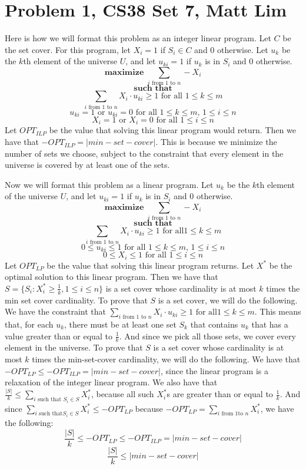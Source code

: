 \documentclass{article}
\begin{document}
\section*{Problem 1, CS38 Set 7, Matt Lim}
Here is how we will format this problem as an integer linear program. Let $C$ be
the set cover. For this
program, let $X_i = 1$ if $S_i \in C$ and $0$ otherwise. Let $u_k$ be the $k$th
element of the universe $U$, and let $u_{ki} = 1$
if $u_k$ is in $S_i$ and $0$ otherwise.
\[ \textbf{maximize } \sum_{i \text{ from $1$ to $n$}} -X_i \]
\[ \textbf{such that} \]
\[ \sum_{i \text{ from $1$ to $n$}} X_i \cdot u_{ki} \geq 1 \text{ for all $1
\leq k \leq m$} \]
\[ u_{ki} = 1 \text{ or } u_{ki} = 0 \text{ for all $1 \leq k \leq m$, $1 \leq i
\leq n$} \]
\[ X_i = 1 \text{ or } X_i = 0 \text{ for all $1 \leq i \leq n$} \]
Let $OPT_{ILP}$ be the value that solving this linear program would return. Then
we have that $-OPT_{ILP} = |min-set-cover|$. This is because we minimize the
number of sets we choose, subject to the constraint that every element in the
universe is covered by at least one of the sets.

Now we will format this problem as a linear program. Let $u_k$ be the $k$th
element of the universe $U$, and let $u_{ki} = 1$
if $u_k$ is in $S_i$ and $0$ otherwise.
\[ \textbf{maximize } \sum_{i \text{ from $1$ to $n$}} -X_i \]
\[ \textbf{such that} \]
\[ \sum_{i \text{ from $1$ to $n$}} X_i \cdot u_{ki} \geq 1 \text{ for all
$1 \leq k \leq m$} \]
\[ 0 \leq u_{ki} \leq 1 \text{ for all $1 \leq k \leq m$, $1 \leq i \leq n$} \]
\[ 0 \leq X_i \leq 1 \text{ for all $1 \leq i \leq n$} \]
Let $OPT_{LP}$ be the value that solving this linear program returns. Let $X^*$
be the optimal solution to this linear program. Then we have that
$S = \{S_i : X_i^* \geq \frac{1}{k}, 1 \leq i \leq n\}$ is a set cover whose cardinality
is at most $k$ times the min set cover cardinality. To prove that $S$ is a set
cover, we will do the following. We have the constraint that
$\sum_{i \text{ from $1$ to $n$}} X_i \cdot u_{ki} \geq 1 \text{ for all
$1 \leq k \leq m$}$. This means that, for each $u_k$, there must be at least one set
$S_k$ that contains $u_k$ that has a value greater than or equal to
$\frac{1}{k}$. And since we pick all those sets, we cover every element in the
universe. To prove that $S$ is a set cover whose cardinality is at most $k$
times the min-set-cover cardinality, we will do the following. We have that
$-OPT_{LP} \leq -OPT_{ILP} = |min-set-cover|$, since the linear program is a
relaxation of the integer linear program. We also have that $\frac{|S|}{k}
\leq \sum_{i \text{ such that $S_i \in S$}} X^*_i$, because all such $X^*_i$s
are greater than or equal to $\frac{1}{k}$. And since $\sum_{i \text{ such that
$S_i \in S$}} X^*_i \leq -OPT_{LP}$ because $-OPT_{LP} = \sum_{i \text{ from $1$
to $n$}} X^*_i$, we have the following:
\[ \frac{|S|}{k} \leq -OPT_{LP} \leq -OPT_{ILP} = |min-set-cover| \]
\[ \frac{|S|}{k} \leq |min-set-cover| \]
\newpage
\end{document}
